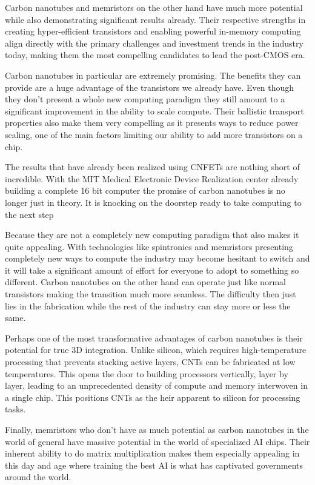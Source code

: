 \documentclass[sigconf]{acmart}
\begin{document}
Carbon nanotubes and memristors on the other hand have much more potential while also 
demonstrating significant results already. Their respective strengths in creating 
hyper-efficient transistors and enabling powerful in-memory computing align directly
with the primary challenges and investment trends in the industry today, making them 
the most compelling candidates to lead the post-CMOS era.

Carbon nanotubes in particular are extremely promising. The benefits they can provide 
are a huge advantage of the transistors we already have. Even though they don't 
present a whole new computing paradigm they still amount to a significant improvement 
in the ability to scale compute. Their ballistic transport properties also make them 
very compelling as it presents ways to reduce power scaling, one of the main factors 
limiting our ability to add more transistors on a chip. 

The results that have already been realized using CNFETs are nothing short of incredible. 
With the MIT Medical Electronic Device Realization center already building a complete 
16 bit computer the promise of carbon nanotubes is no longer just in theory. It is 
knocking on the doorstep ready to take computing to the next step

Because they are not a completely new computing paradigm that also makes it quite appealing. 
With technologies like spintronics and memristors presenting completely new ways to compute
the industry may become hesitant to switch and it will take a significant amount of effort
for everyone to adopt to something so different. Carbon nanotubes on the other hand can operate
just like normal transistors making the transition much more seamless. The difficulty then just 
lies in the fabrication while the rest of the industry can stay more or less the same. 

Perhaps one of the most transformative advantages of carbon nanotubes is their potential 
for true 3D integration. Unlike silicon, which requires high-temperature processing that 
prevents stacking active layers, CNTs can be fabricated at low temperatures. This opens the 
door to building processors vertically, layer by layer, leading to an unprecedented density
of compute and memory interwoven in a single chip. This positions CNTs as the heir apparent 
to silicon for processing tasks.

Finally, memristors who don't have as much potential as carbon nanotubes in the world 
of general have massive potential in the world of specialized AI chips. Their inherent 
ability to do matrix multiplication makes them especially appealing in this day and age 
where training the best AI is what has captivated governments around the world. 
\end{document}
